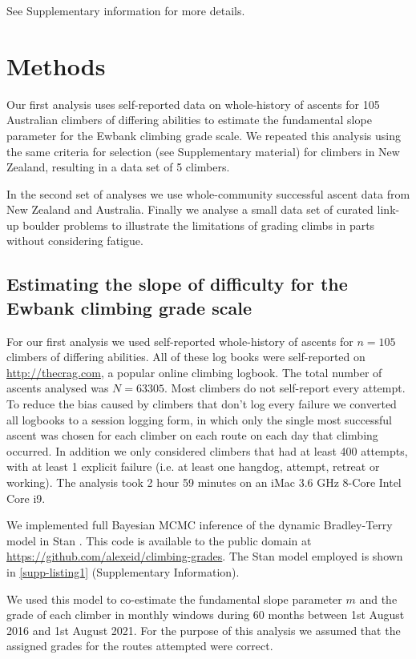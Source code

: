\documentclass{article}
\newcommand{\C}{105}
\newcommand{\N}{63305}
\newcommand{\minattempts}{400}
\newcommand{\minfails}{1}
\newcommand{\stantime}{2 hour 59 minutes}
\newcommand{\Cnz}{5}
\begin{document}
See Supplementary information for more details.

\section*{Methods}

Our first analysis uses self-reported data on whole-history of ascents for \C{} Australian climbers of differing abilities to estimate the fundamental slope parameter for the Ewbank climbing grade scale. We repeated this analysis using the same criteria for selection (see Supplementary material) for climbers in New Zealand, resulting in a data set of \Cnz{} climbers. 

In the second set of analyses we use whole-community successful ascent data from New Zealand and Australia. Finally we analyse a small data set of curated link-up boulder problems to illustrate the limitations of grading climbs in parts without considering fatigue.

\subsection*{Estimating the slope of difficulty for the Ewbank climbing grade scale}

For our first analysis we used self-reported whole-history of ascents for $n=\C{}$ climbers of differing abilities. All of these log books were self-reported on \url{http://thecrag.com}, a popular online climbing logbook. The total number of ascents analysed was $N=\N$. Most climbers do not self-report every attempt. To reduce the bias caused by climbers that don't log every failure we converted all logbooks to a session logging form, in which only the single most successful ascent was chosen for each climber on each route on each day that climbing occurred. In addition we only considered climbers that had at least \minattempts{} attempts, with at least \minfails{} explicit failure (i.e. at least one \gls{hangdog}, attempt, retreat or working). The analysis took \stantime{} on an iMac 3.6 GHz 8-Core Intel Core i9.

We implemented full Bayesian MCMC inference of the dynamic Bradley-Terry model in Stan \cite{carpenter2017stan}. This code is available to the public domain at \url{https://github.com/alexeid/climbing-grades}.
The Stan model employed is shown in \cref{supp-listing1} (Supplementary Information).

We used this model to co-estimate the fundamental slope parameter $m$ and the grade of each climber in monthly windows during 60 months between 1st August 2016 and 1st August 2021. For the purpose of this analysis we assumed that the assigned grades for the routes attempted were correct.
\end{document}
